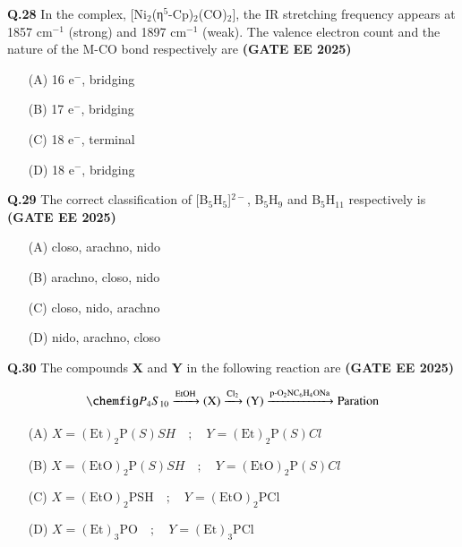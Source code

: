 \documentclass[journal,12pt,onecolumn]{exam}
\theoremstyle{remark}
\begin{document}
\noindent \textbf{Q.28} In the complex, [Ni$_2$(η$^5$-Cp)$_2$(CO)$_2$], the IR stretching frequency appears at 1857 cm$^{-1}$ (strong) and 1897 cm$^{-1}$ (weak). The valence electron count and the nature of the M-CO bond respectively are \hfill{\textbf{(GATE EE 2025)}}
\begin{multicols}{2}
\begin{itemize}[leftmargin=*,labelsep=1em]
    \item[(A)] 16 e$^-$, bridging
    \item[(B)] 17 e$^-$, bridging
    \item[(C)] 18 e$^-$, terminal
    \item[(D)] 18 e$^-$, bridging
\end{itemize}
\end{multicols}
\vspace{0.5cm}

\noindent \textbf{Q.29} The correct classification of [B$_5$H$_5$]$^{2-}$, B$_5$H$_9$ and B$_5$H$_{11}$ respectively is \hfill{\textbf{(GATE EE 2025)}}
\begin{multicols}{2}
\begin{itemize}[leftmargin=*,labelsep=1em]
    \item[(A)] closo, arachno, nido
    \item[(B)] arachno, closo, nido
    \item[(C)] closo, nido, arachno
    \item[(D)] nido, arachno, closo
\end{itemize}
\end{multicols}
\vspace{0.5cm}


\noindent \textbf{Q.30} The compounds \textbf{X} and \textbf{Y} in the following reaction are
\hfill \textbf{(GATE EE 2025)}

\[
\chemfig P_4S_{10} \xrightarrow{\ce{EtOH}} \text{(X)}
\xrightarrow{\ce{Cl_2}} \text{(Y)}
 \xrightarrow{\ce{p-O_2NC_6H_4ONa}} \text{Paration} 
\]


\begin{multicols}{2}
\begin{itemize}[leftmargin=*, labelsep=1em]
    \item[(A)] $X = (\mathrm{Et})_2\mathrm{P}(S)SH \quad ; \quad Y = (\mathrm{Et})_2\mathrm{P}(S)Cl$
    \item[(B)] $X = (\mathrm{EtO})_2\mathrm{P}(S)SH \quad ; \quad Y = (\mathrm{EtO})_2\mathrm{P}(S)Cl$
    \item[(C)] $X = (\mathrm{EtO})_2\mathrm{PSH} \quad ; \quad Y = (\mathrm{EtO})_2\mathrm{PCl}$
    \item[(D)] $X = (\mathrm{Et})_3\mathrm{PO} \quad ; \quad Y = (\mathrm{Et})_3\mathrm{PCl}$
\end{itemize}
\end{multicols}
\vspace{0.5 cm}
\end{document}
